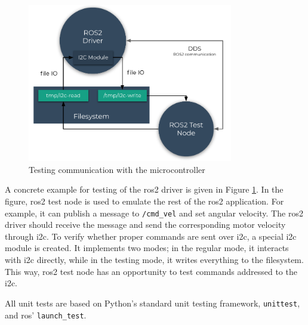 \begin{figure}[H]
    \centering
    \includegraphics[width=0.8\textwidth]{physical/figures/mocking.pdf}
    \caption{Testing communication with the microcontroller}
    \label{fig:physical:mocking}
\end{figure}

A concrete example for testing of the \ac{ros2} driver is given in Figure \ref{fig:physical:mocking}.
In the figure, \ac{ros2} test node is used to emulate the rest of the \ac{ros2} application.
For example, it can publish a message to \texttt{/cmd\_vel} and set angular velocity.
The \ac{ros2} driver should receive the message and send the corresponding motor velocity through \ac{i2c}.
To verify whether proper commands are sent over \ac{i2c}, a special \ac{i2c} module is created.
It implements two modes; in the regular mode, it interacts with \ac{i2c} directly, while in the testing mode, it writes everything to the filesystem. 
This way, \ac{ros2} test node has an opportunity to test commands addressed to the \ac{i2c}.

All unit tests are based on Python's standard unit testing framework, \texttt{unittest}, and \ac{ros}' \texttt{launch\_test}.

